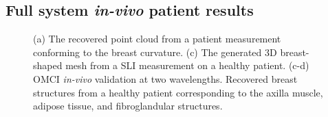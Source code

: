 \subsection{Full system \textit{in-vivo} patient results}
\begin{figure}[]
    \begin{center}
    \end{center}
    \caption{(a) The recovered point cloud from a patient measurement conforming to the breast curvature. (c) The generated 3D breast-shaped mesh from a \ac{SLI} measurement on a healthy patient. (c-d) \ac{OMCI} \textit{in-vivo} validation at two wavelengths. Recovered breast structures from a healthy patient corresponding to the axilla muscle, adipose tissue, and fibroglandular structures.} 
    \label{fig:PatientResults}
\end{figure} 

